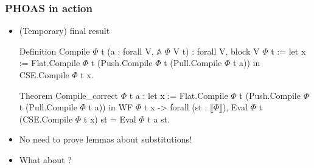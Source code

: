 \documentclass[9pt]{beamer}
\newcommand\denote[1]{\llbracket #1 \rrbracket}
\begin{document}
\begin{frame}[fragile]
  \frametitle{PHOAS in action}

  \begin{itemize}
  \item<+-> (Temporary) final result
\begin{coq}
Definition Compile $\Phi$ t  (a : forall V, $\mathbb A$ $\Phi$ V t) : forall V, block V $\Phi$ t :=
  let x := Flat.Compile $\Phi$ t (Push.Compile $\Phi$  t (Pull.Compile $\Phi$  t a)) in
  CSE.Compile $\Phi$ t x.
\end{coq}

\begin{coq}
Theorem Compile_correct $\Phi$ t a :
  let x := Flat.Compile $\Phi$ t (Push.Compile $\Phi$  t (Pull.Compile $\Phi$  t a)) in
  WF $\Phi$ t x -> forall (st : $\denote\Phi$),  Eval $\Phi$ t (CSE.Compile $\Phi$ t x) st = Eval $\Phi$ t a st. 
\end{coq}

\item<+-> No need to prove lemmas about substitutions!
\item<+-> What about  ? 
\end{itemize}
\end{frame}
\end{document}
